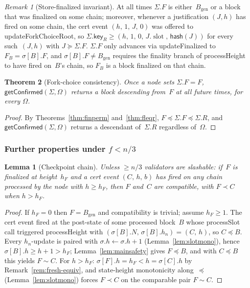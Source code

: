 \documentclass{article}
\newcommand{\genesis}{\ensuremath{B_{\mathrm{gen}}}}
\newcommand{\slot}[0]{\ensuremath{\operatorname{\mathrm{slot}}}}
\newcommand{\hash}{\mathsf{hash}}
\newcommand{\key}{\mathsf{key}}
\newcommand{\processSlot}{\textsf{processSlot}\xspace}
\newcommand{\processHeight}{\textsf{processHeight}\xspace}
\newcommand{\updateForkChoiceRoot}{\textsf{updateForkChoiceRoot}\xspace}
\newcommand{\updateFinalized}{\textsf{updateFinalized}\xspace}
\newcommand{\getConfirmed}{\textsf{getConfirmed}\xspace}
\theoremstyle{plain}
\newtheorem{theorem}{Theorem}
\newtheorem{lemma}{Lemma}
\theoremstyle{definition}
\theoremstyle{remark}
\newtheorem{remark}[theorem]{Remark}
\begin{document}
\begin{remark}[Store-finalized invariant]\label{rem:fs-invariant}
At all times $\Sigma.F$ is either~$\genesis$ or a block that was finalized on some chain; moreover, whenever a justification $(J, h)$ has fired on some chain, the cert event $(h,\, 1,\, J,\, 0)$ was offered to \updateForkChoiceRoot, so $\Sigma.\key_R \geq (h,\, 1,\, 0,\, J.\slot,\, \hash(J))$ for every such~$(J, h)$ with $J \succeq \Sigma.F$.
$\Sigma.F$ only advances via \updateFinalized to $F_B = \sigma[B].F$, and $\sigma[B].F \neq \genesis$ requires the finality branch of \processHeight to have fired on~$B$'s chain, so $F_B$ is a block finalized on that chain.
\end{remark}

\begin{theorem}[Fork-choice consistency]\label{thm:fcconsistency}
Once a node sets $\Sigma.F = F$, $\getConfirmed(\Sigma, \Omega)$ returns a block descending from~$F$ at all future times, for every $\Omega$.
\end{theorem}

\begin{proof}
By Theorems~\ref{thm:finperm} and~\ref{thm:fleqr}, $F \preceq \Sigma.F \preceq \Sigma.R$, and $\getConfirmed(\Sigma, \Omega)$ returns a descendant of~$\Sigma.R$ regardless of~$\Omega$.
\end{proof}

\subsubsection*{Further properties under $f < n/3$}

\begin{lemma}[Checkpoint chain]\label{lem:certchain}
Unless $\geq n/3$ validators are slashable: if~$F$ is finalized at height~$h_F$ and a cert event $(C,\, h,\, b)$ has fired on any chain processed by the node with $h \geq h_F$, then $F$ and~$C$ are compatible, with $F \prec C$ when $h > h_F$.
\end{lemma}

\begin{proof}
If $h_F = 0$ then $F = \genesis$ and compatibility is trivial; assume $h_F \geq 1$.
The cert event fired at the post-state of some processed block~$B$ whose \processSlot call triggered \processHeight with $(\sigma[B].N,\, \sigma[B].h_n) = (C,\, h)$, so $C \preceq B$.
Every $h_n$-update is paired with $\sigma.h \gets \sigma.h + 1$ (Lemma~\ref{lem:slotmono}), hence $\sigma[B].h \geq h + 1 > h_F$; Lemma~\ref{lem:mainsafety} gives $F \preceq B$, and with $C \preceq B$ this yields $F \sim C$.
For $h > h_F$: $\sigma[F].h = h_F < h = \sigma[C].h$ by Remark~\ref{rem:fresh-equiv}, and state-height monotonicity along~$\preceq$ (Lemma~\ref{lem:slotmono}) forces $F \prec C$ on the comparable pair $F \sim C$.
\end{proof}
\end{document}
